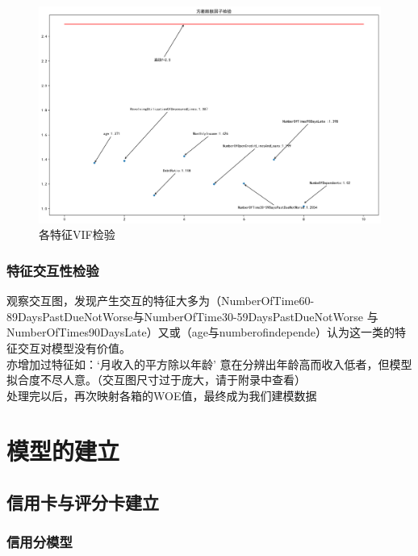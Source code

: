 \documentclass[12pt]{article}
\begin{document}
\begin{figure}[H]
	\centering
	\includegraphics[width=1\linewidth]{figures/index}
	\caption{各特征VIF检验}
\end{figure}


\vspace{1.5cm}

\subsubsection{特征交互性检验}


\begin{flushleft}
	\noindent\qquad 观察交互图，发现产生交互的特征大多为（NumberOfTime60-89DaysPastDueNotWorse与NumberOfTime30-59DaysPastDueNotWorse 与 NumberOfTimes90DaysLate）又或（age与numberofindepende）认为这一类的特征交互对模型没有价值。\\
	\noindent\qquad 亦增加过特征如：‘月收入的平方除以年龄’ 意在分辨出年龄高而收入低者，但模型拟合度不尽人意。（交互图尺寸过于庞大，请于附录中查看）\\
	\noindent\qquad 处理完以后，再次映射各箱的WOE值，最终成为我们建模数据
	
\end{flushleft}
\newpage


\section{模型的建立}

\subsection{信用卡与评分卡建立}
\subsubsection{信用分模型}
\end{document}
